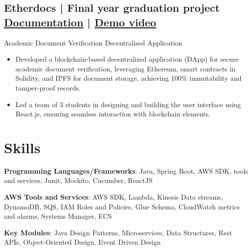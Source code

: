 \documentclass[a4,10pt]{article}
\newcommand{\subtext}[1]{
#1\par\vspace{-0.2cm}}
\newenvironment{zitemize}{
\begin{itemize}\itemsep0pt \parskip0pt \parsep1pt}
{\end{itemize}\vspace{-0.5cm}}
\begin{document}
\subsection*{Etherdocs | Final year graduation project \hfill {\href{https://github.com/DevelopersLeague/EtherDocs/blob/main/Readme.md}{Documentation}} | {\href{https://youtu.be/B_44aJ9hh6U?si=dGItpsQ3AEo_eIxk}{Demo video} }
}
\subtext{{\normalsize\normalfont Academic Document Verification Decentralised Application}}
    \begin{zitemize}
        \item Developed a blockchain-based decentralized application (DApp) for secure academic document verification, leveraging Ethereum, smart contracts in Solidity, and IPFS for document storage, achieving 100\% immutability and tamper-proof records.
        \item Led a team of 3 students in designing and building the user interface using React.js, ensuring seamless interaction with blockchain elements.
    \end{zitemize}



\section{Skills}
\textbf{Programming Languages/Frameworks}: Java, Spring Boot, AWS SDK, tools and services, Junit, Mockito, Cucumber, ReactJS 

\textbf{AWS Tools and Services}: AWS SDK, Lambda, Kinesis Data streams, DynamoDB, SQS, IAM Roles and Policies, Glue Schema, CloudWatch metrics and alarms, Systems Manager, ECS

\textbf{Key Modules}: Java Design Patterns, Microservices, Data Structures, Rest APIs, Object-Oriented Design, Event Driven Design
     

\end{document}

